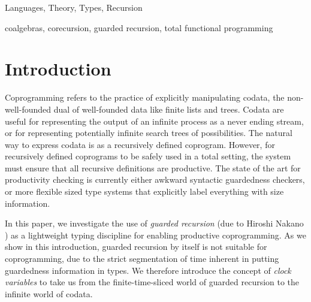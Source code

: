 \documentclass[natbib]{sigplanconf}
\begin{document}
\terms
  Languages, Theory, Types, Recursion

\keywords
  coalgebras, corecursion, guarded recursion, total functional programming

\section{Introduction}
\label{sec:introduction}

Coprogramming refers to the practice of explicitly manipulating
codata, the non-well-founded dual of well-founded data like finite
lists and trees. Codata are useful for representing the output of an
infinite process as a never ending stream, or for representing
potentially infinite search trees of possibilities. The natural way to
express codata is as a recursively defined coprogram. However, for
recursively defined coprograms to be safely used in a total setting,
the system must ensure that all recursive definitions are
productive. The state of the art for productivity checking is
currently either awkward syntactic guardedness checkers, or more
flexible sized type systems that explicitly label everything with size
information.

In this paper, we investigate the use of \emph{guarded recursion} (due
to Hiroshi Nakano \cite{nakano00modality}) as a lightweight typing
discipline for enabling productive coprogramming. As we show in this
introduction, guarded recursion by itself is not suitable for
coprogramming, due to the strict segmentation of time inherent in
putting guardedness information in types. We therefore introduce the
concept of \emph{clock variables} to take us from the
finite-time-sliced world of guarded recursion to the infinite world of
codata.
\end{document}
